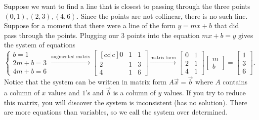 \documentclass[10pt]{article}
\begin{document}
Suppose we want to find a line that is closest to passing through the three points $(0,1),(2,3),(4,6)$.  Since the points are not collinear, there is no such line.  Suppose for a moment that there were a line of the form $y=mx+b$ that did pass through the points.  Plugging our 3 points into the equation $mx+b=y$ gives the system of equations 
$$\begin{cases}b=1\\2m+b=3\\4m+b=6\end{cases}
\xrightarrow{\text{augmented matrix}}
\begin{bmatrix}[cc|c]0&1&1\\2&1&3\\4&1&6\end{bmatrix}
\xrightarrow{\text{matrix form}}
\begin{bmatrix}0&1\\2&1\\4&1\end{bmatrix}
\begin{bmatrix}m\\b\end{bmatrix}
=\begin{bmatrix}1\\3\\6\end{bmatrix}.
$$
Notice that the system can be written in matrix form $A\vec x = \vec b$ where $A$ contains a column of $x$ values and $1$'s and $\vec b$ is a column of $y$ values. If you try to reduce this matrix, you will discover the system is inconsistent (has no solution).  There are more equations than variables, so we call the system over determined. 
\end{document}

